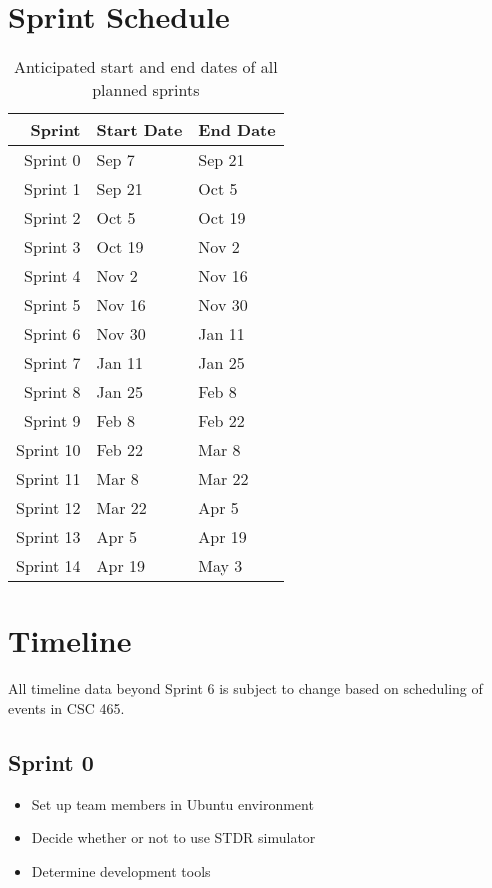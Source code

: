 \section{Sprint Schedule}
\begin{table}
\begin{center}
	\begin{tabular}{r | l l}
		Sprint & Start Date & End Date \\ \hline
		Sprint 0 & Sep 7 & Sep 21 \\
		Sprint 1 & Sep 21 & Oct 5 \\
		Sprint 2 & Oct 5 & Oct 19 \\
		Sprint 3 & Oct 19 & Nov 2 \\
		Sprint 4 & Nov 2 & Nov 16 \\
		Sprint 5 & Nov 16 & Nov 30 \\
		Sprint 6 & Nov 30 & Jan 11 \\
		Sprint 7 & Jan 11 & Jan 25 \\
		Sprint 8 & Jan 25 & Feb 8 \\
		Sprint 9 & Feb 8 & Feb 22 \\
		Sprint 10 & Feb 22 & Mar 8 \\
		Sprint 11 & Mar 8 & Mar 22 \\
		Sprint 12 & Mar 22 & Apr 5 \\
		Sprint 13 & Apr 5 & Apr 19 \\
		Sprint 14 & Apr 19 & May 3 \\
	\end{tabular}
\end{center}
\caption{Anticipated start and end dates of all planned sprints}
\end{table}

\section{Timeline}
All timeline data beyond Sprint 6 is subject to change based on scheduling of events in CSC 465.
\subsection{Sprint 0}
\begin{itemize}
	\item Set up team members in Ubuntu environment
	\item Decide whether or not to use STDR simulator 
 	\item Determine development tools
\end{itemize}

